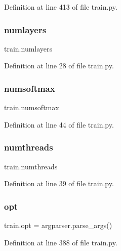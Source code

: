 Definition at line 413 of file train.\+py.

\mbox{\label{namespacetrain_aff60f16f2f335b777b21dfdb806544b9}} 
\subsubsection{\texorpdfstring{numlayers}{numlayers}}
{\footnotesize\ttfamily train.\+numlayers}



Definition at line 28 of file train.\+py.

\mbox{\label{namespacetrain_ab8a86e94cd6c6844e5574a7c41953bea}} 
\subsubsection{\texorpdfstring{numsoftmax}{numsoftmax}}
{\footnotesize\ttfamily train.\+numsoftmax}



Definition at line 44 of file train.\+py.

\mbox{\label{namespacetrain_a2fc0d02c023dcccfff9e4e1dd3e66f56}} 
\subsubsection{\texorpdfstring{numthreads}{numthreads}}
{\footnotesize\ttfamily train.\+numthreads}



Definition at line 39 of file train.\+py.

\mbox{\label{namespacetrain_a8ce47f3ce85e34ed945573b80e08aaf6}} 
\subsubsection{\texorpdfstring{opt}{opt}}
{\footnotesize\ttfamily train.\+opt = argparser.\+parse\+\_\+args()}



Definition at line 388 of file train.\+py.

